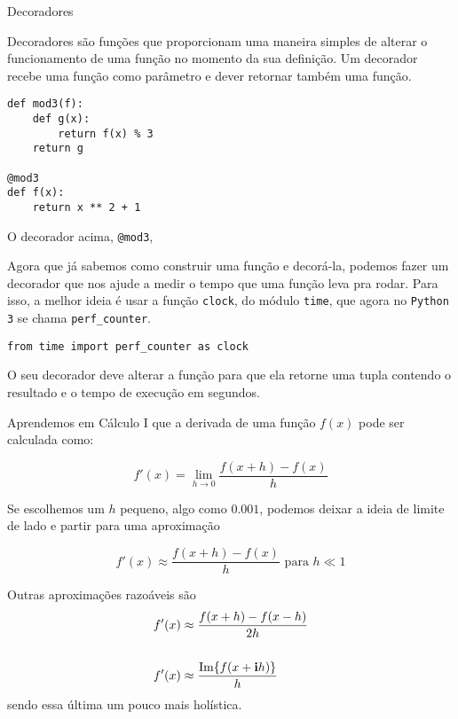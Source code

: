 \documentclass[12pt]{article}
\begin{document}
	\begin{interlude}{Decoradores \label{i:decoradores}}
	
	Decoradores são funções que proporcionam uma maneira simples de alterar o funcionamento de uma função no momento da sua definição. Um decorador recebe uma função como parâmetro e dever retornar também uma função.
	
	\begin{lstlisting}
def mod3(f):
	def g(x):
		return f(x) % 3
	return g
	
@mod3
def f(x):
	return x ** 2 + 1
	\end{lstlisting}
	
	O decorador acima, \texttt{@mod3}, 
	
	\end{interlude}
	
	
	Agora que já sabemos como construir uma função e decorá-la, podemos fazer um decorador que nos ajude a medir o tempo que uma função leva pra rodar. Para isso, a melhor ideia é usar a função \texttt{clock}, do módulo \texttt{time}, que agora no \texttt{Python 3} se chama \texttt{perf\_{}counter}.
	
	\begin{lstlisting}
from time import perf_counter as clock
	\end{lstlisting}
	
	\quest O seu decorador deve alterar a função para que ela retorne uma tupla contendo o resultado e o tempo de execução em segundos.
	
	
	Aprendemos em Cálculo I que a derivada de uma função $f(x)$ pode ser calculada como:
	
		$$f'(x) = \lim_{h \to 0} \frac{f(x + h) - f(x)}{h}$$
	
	Se escolhemos um $h$ pequeno, algo como $0.001$, podemos deixar a ideia de limite de lado e partir para uma aproximação
	
		$$f'(x) \approx \frac{f(x + h) - f(x)}{h} \text{ para } h \ll 1$$

	Outras aproximações razoáveis são	
		\begin{align*}
		f'(x) &\approx \frac{f(x + h) - f(x - h)}{2h}\\
		\\		
		f'(x) &\approx \frac{ \text{Im}\{f(x + \mathbf{i}h)\} }{h} 
		\end{align*}	
	sendo essa última um pouco mais holística.\\
	
\end{document}
